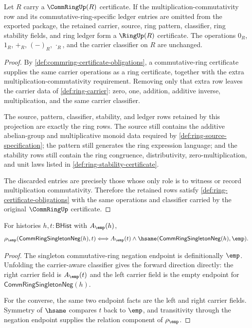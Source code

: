 \begin{proposition}
\label{prop:commring-forgets-ring-certificate}
Let $R$ carry a $\CommRingUp(R)$ certificate. If the multiplication-commutativity
row and its commutative-ring-specific ledger entries are omitted from the
exported package, the retained carrier, source, ring pattern, classifier, ring
stability fields, and ring ledger form a $\RingUp(R)$ certificate. The
operations $0_R$, $1_R$, $+_R$, $(-)_R$, $\cdot_R$, and the carrier classifier
on $R$ are unchanged.
\end{proposition}
\begin{proof}
By \autoref{def:commring-certificate-obligations}, a commutative-ring
certificate supplies the same carrier operations as a ring certificate,
together with the extra multiplication-commutativity requirement. Removing only
that extra row leaves the carrier data of \autoref{def:ring-carrier}: zero,
one, addition, additive inverse, multiplication, and the same carrier
classifier.

The source, pattern, classifier, stability, and ledger rows retained by this
projection are exactly the ring rows. The source still contains the additive
abelian-group and multiplicative monoid data required by
\autoref{def:ring-source-specification}; the pattern still generates the ring
expression language; and the stability rows still contain the ring
congruence, distributivity, zero-multiplication, and unit laws listed in
\autoref{def:ring-stability-certificate}.

The discarded entries are precisely those whose only role is to witness or
record multiplication commutativity. Therefore the retained rows satisfy
\autoref{def:ring-certificate-obligations} with the same operations and
classifier carried by the original $\CommRingUp$ certificate.
\end{proof}

\begin{theorem}
\label{thm:commring-singleton-neg-empty-endpoint}
For histories $h,t:\mathsf{BHist}$ with $A_{\emp}(h)$,
$$
\rho_{\emp}(\mathsf{CommRingSingletonNeg}(h),t)
\Longleftrightarrow
A_{\emp}(t)\land
\hsame(\mathsf{CommRingSingletonNeg}(h),\emp).
$$
\end{theorem}
\begin{proof}
The singleton commutative-ring negation endpoint is definitionally $\emp$.
Unfolding the carrier-aware classifier gives the forward direction directly:
the right carrier field is $A_{\emp}(t)$ and the left carrier field is the
empty endpoint for $\mathsf{CommRingSingletonNeg}(h)$.

For the converse, the same two endpoint facts are the left and right carrier
fields. Symmetry of $\hsame$ compares $t$ back to $\emp$, and transitivity
through the negation endpoint supplies the relation component of
$\rho_{\emp}$.
\end{proof}

